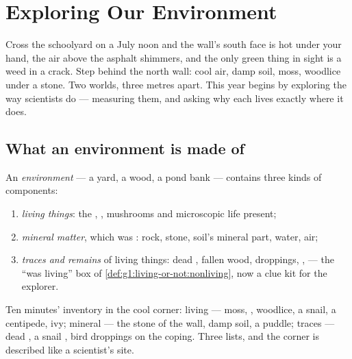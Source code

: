 \chapter{Exploring Our Environment}\label{ch:g6:exploring-our-environment}

Cross the schoolyard on a July noon and the wall's south face is
hot under your hand, the air above the asphalt shimmers, and the
only green thing in sight is a weed in a crack. Step behind the
north wall: cool air, damp soil, moss, woodlice under a stone.
Two worlds, three metres apart. This year begins by exploring
 the way scientists do --- measuring them, and
asking why each  lives exactly where it does.

\section{What an environment is made of}

\begin{definition}\label{def:g6:exploring-our-environment:components}
An \emph{environment} --- a yard, a wood, a
pond bank --- contains three kinds of components:
\begin{enumerate}
  \item \emph{living things}: the ,
        , mushrooms and microscopic life present;
  \item \emph{mineral matter}, which was
        : rock, stone, soil's mineral part, water,
        air;
  \item \emph{traces and remains} of living things: dead
        , fallen wood, droppings, ,  ---
        the ``was living'' box of
        \cref{def:g1:living-or-not:nonliving}, now a clue kit
        for the explorer.
\end{enumerate}
\end{definition}

\begin{example}\label{ex:g6:exploring-our-environment:inventory}
Ten minutes' inventory in the cool corner: living --- moss,
, woodlice, a snail, a centipede, ivy; mineral --- the
stone of the wall, damp soil, a puddle; traces --- dead
, a snail , bird droppings on the coping. Three
lists, and the corner is described like a scientist's site.
\end{example}

